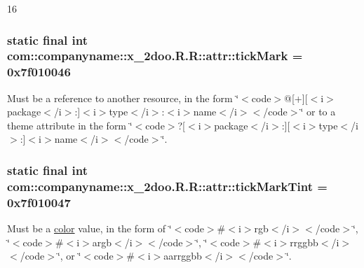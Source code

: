 16\hypertarget{classcom_1_1companyname_1_1x__2doo_1_1_r_1_1attr_9b271e9b56cb4bf955480a269eb005a4}{
\subsubsection[{tickMark}]{\setlength{\rightskip}{0pt plus 5cm}static final int com::companyname::x\_\-2doo.R.R::attr::tickMark = 0x7f010046}}
\label{classcom_1_1companyname_1_1x__2doo_1_1_r_1_1attr_9b271e9b56cb4bf955480a269eb005a4}


Must be a reference to another resource, in the form \char`\"{}$<$code$>$@\mbox{[}+\mbox{]}\mbox{[}$<$i$>$package$<$/i$>$:\mbox{]}$<$i$>$type$<$/i$>$:$<$i$>$name$<$/i$>$$<$/code$>$\char`\"{} or to a theme attribute in the form \char`\"{}$<$code$>$?\mbox{[}$<$i$>$package$<$/i$>$:\mbox{]}\mbox{[}$<$i$>$type$<$/i$>$:\mbox{]}$<$i$>$name$<$/i$>$$<$/code$>$\char`\"{}. \hypertarget{classcom_1_1companyname_1_1x__2doo_1_1_r_1_1attr_8468cf7dcc47f0da7291e4e7f59e235d}{
\subsubsection[{tickMarkTint}]{\setlength{\rightskip}{0pt plus 5cm}static final int com::companyname::x\_\-2doo.R.R::attr::tickMarkTint = 0x7f010047}}
\label{classcom_1_1companyname_1_1x__2doo_1_1_r_1_1attr_8468cf7dcc47f0da7291e4e7f59e235d}


Must be a \hyperlink{classcom_1_1companyname_1_1x__2doo_1_1_r_1_1color}{color} value, in the form of \char`\"{}$<$code$>$\#$<$i$>$rgb$<$/i$>$$<$/code$>$\char`\"{}, \char`\"{}$<$code$>$\#$<$i$>$argb$<$/i$>$$<$/code$>$\char`\"{}, \char`\"{}$<$code$>$\#$<$i$>$rrggbb$<$/i$>$$<$/code$>$\char`\"{}, or \char`\"{}$<$code$>$\#$<$i$>$aarrggbb$<$/i$>$$<$/code$>$\char`\"{}. 

